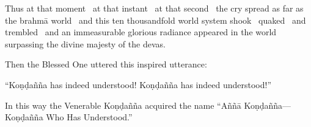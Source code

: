 Thus at that moment \breathmark\ at that instant \breathmark\ at that second \breathmark\ the cry spread as far as the brahmā world \breathmark\ and this ten thousandfold world system shook \breathmark\ quaked \breathmark\ and trembled \breathmark\ and an immeasurable glorious radiance appeared in the world surpassing the divine majesty of the devas.

Then the Blessed One uttered this inspired utterance:

“Koṇḍañña has indeed understood! Koṇḍañña has indeed understood!”

In this way the Venerable Koṇḍañña acquired the name “Aññā Koṇḍañña—Koṇḍañña Who Has Understood.”

\suttaRef{[SN 56.11]}
